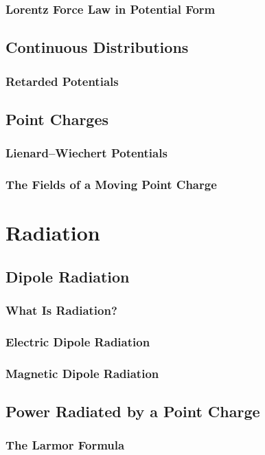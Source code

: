 \documentclass[11pt,a4paper]{article}
\begin{document}
\subsubsection{Lorentz Force Law in Potential Form}
\subsection{Continuous Distributions}
\subsubsection{Retarded Potentials}
\subsection{Point Charges}
\subsubsection{Lienard--Wiechert Potentials}
\subsubsection{The Fields of a Moving Point Charge}
\section{Radiation}
\subsection{Dipole Radiation}
\subsubsection{What Is Radiation?}
\subsubsection{Electric Dipole Radiation}
\subsubsection{Magnetic Dipole Radiation}
\subsection{Power Radiated by a Point Charge}
\subsubsection{The Larmor Formula}
\end{document}
